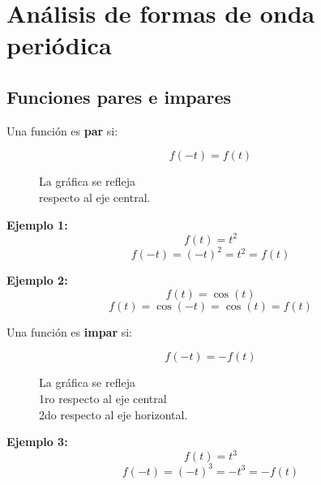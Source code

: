 \chapter{Análisis de formas de onda periódica}

\section{Funciones pares e impares}
Una función es \textbf{par} si:

\begin{equation}
    f(-t)=f(t)
\end{equation}

\begin{figure}[H]
    \centering
    
    \caption{La gráfica se refleja \\respecto al eje central.}
\end{figure}

\textbf{Ejemplo 1:}
\begin{equation*}
    f(t)=t^2
\end{equation*}
\begin{equation*}
    f(-t)={(-t)}^2=t^2=f(t)
\end{equation*}

\textbf{Ejemplo 2:}
\begin{equation*}
    f(t)=\cos(t)
\end{equation*}
\begin{equation*}
    f(t)=\cos(-t)=\cos(t)=f(t)
\end{equation*}

Una función es \textbf{impar} si:

\begin{equation}
    f(-t)=-f(t)
\end{equation}

\begin{figure}[H]
    \centering
    
    \caption{La gráfica se refleja \\
    1ro respecto al eje central\\
    2do respecto al eje horizontal.}
\end{figure}

\textbf{Ejemplo 3:}
\begin{equation*}
    f(t)=t^3
\end{equation*}
\begin{equation*}
    f(-t)={(-t)}^3=-t^3=-f(t)
\end{equation*}

